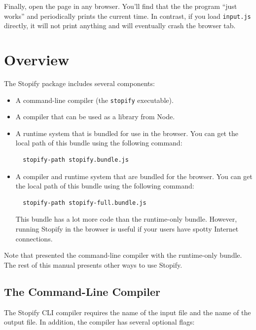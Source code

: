 \documentclass[10pt]{book}
\begin{document}
Finally, open the page in any browser. You'll find that the the program
``just works'' and periodically prints the current time. In contrast, if you
load \texttt{input.js} directly, it will not print anything and will eventually
crash the browser tab.

\chapter{Overview}

The Stopify package includes several components:

\begin{itemize}

  \item A command-line compiler (the \texttt{stopify} executable).

  \item A compiler that can be used as a library from Node.

  \item A runtime system that is bundled for use in the browser. You
  can get the local path of this bundle using the following command:
  \lstset{language=console}
  \begin{lstlisting}
  stopify-path stopify.bundle.js
  \end{lstlisting}

  \item A compiler and runtime system that are bundled for the browser.
  You can get the local path of this bundle using the following command:
  \lstset{language=console}
  \begin{lstlisting}
  stopify-path stopify-full.bundle.js
  \end{lstlisting}
  This bundle has a lot more code than the runtime-only bundle. However, running Stopify in the
  browser is useful if your users have spotty Internet connections.

\end{itemize}

Note that  presented the command-line compiler with the
runtime-only bundle. The rest of this manual presents other ways to use
Stopify.

\section{The Command-Line Compiler}
\lstset{language=console}

The Stopify CLI compiler requires the name of the input file and the name
of the output file. In addition, the compiler has several
optional flags:
\end{document}
